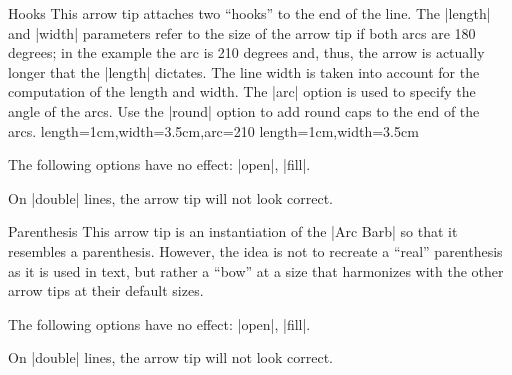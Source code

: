 \begin{arrowtip}{Hooks}{
    This arrow tip attaches two ``hooks'' to the end of the line. The |length|
    and |width| parameters refer to the size of the arrow tip if both arcs are
    180 degrees; in the example the arc is 210 degrees and, thus, the arrow is
    actually longer that the |length| dictates. The line width is taken into
    account for the computation of the length and width. The |arc| option is
    used to specify the angle of the arcs. Use the |round| option to add round
    caps to the end of the arcs.
}%
{length=1cm,width=3.5cm,arc=210}%
{length=1cm,width=3.5cm}

    \begin{arrowexamples}
        \arrowexample[]
        \arrowexampledup[sep]
        \arrowexampledupdot[sep]
        \arrowexample[arc=120]
        \arrowexample[arc=270]
        \arrowexample[length=2pt]
        \arrowexample[length=2pt,width=5pt]
        \arrowexample[line width=2pt]
        \arrowexample[reversed]
        \arrowexample[round]
        \arrowexample[slant=.3]
        \arrowexample[left]
        \arrowexample[right]
        \arrowexample[red]
    \end{arrowexamples}
    The following options have no effect: |open|, |fill|.

    On |double| lines, the arrow tip will not look correct.
\end{arrowtip}

\begin{arrowtip}{Parenthesis}{
    This arrow tip is an instantiation of the |Arc Barb| so that it resembles a
    parenthesis. However, the idea is not to recreate a ``real'' parenthesis as
    it is used in text, but rather a ``bow'' at a size that harmonizes with the
    other arrow tips at their default sizes.
}%
{}%
{}

    \begin{arrowexamples}
        \arrowexample[]
        \arrowexampledup[sep]
        \arrowexampledupdot[sep]
        \arrowexample[reversed]
        \arrowexample[round]
        \arrowexample[slant=.3]
        \arrowexample[left]
        \arrowexample[right]
        \arrowexample[red]
    \end{arrowexamples}
    The following options have no effect: |open|, |fill|.

    On |double| lines, the arrow tip will not look correct.
\end{arrowtip}

